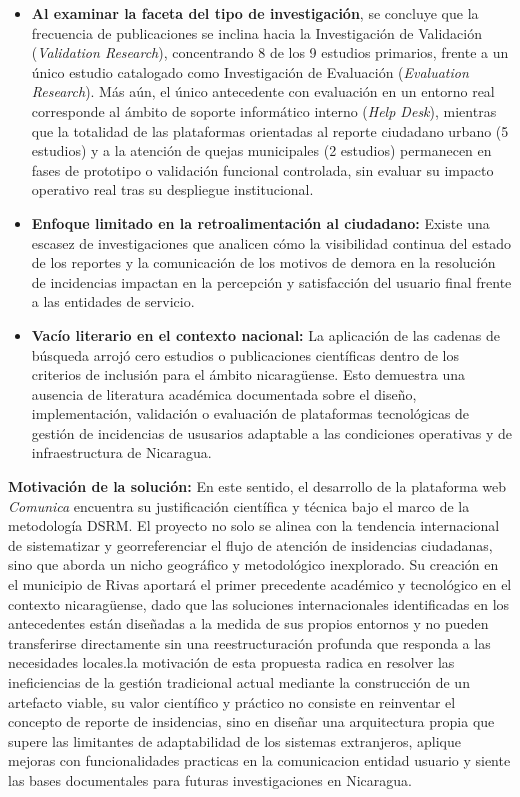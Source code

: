 \begin{itemize}
	\item \textbf {Al examinar la faceta del tipo de investigación}, se concluye que la frecuencia de publicaciones se inclina hacia la Investigación de Validación (\textit{Validation Research}), concentrando 8 de los 9 estudios primarios, frente a un único estudio catalogado como Investigación de Evaluación (\textit{Evaluation Research}). Más aún, el único antecedente con evaluación en un entorno real corresponde al ámbito de soporte informático interno (\textit{Help Desk}), mientras que la totalidad de las plataformas orientadas al reporte ciudadano urbano (5 estudios) y a la atención de quejas municipales (2 estudios) permanecen en fases de prototipo o validación funcional controlada, sin evaluar su impacto operativo real tras su despliegue institucional.
	
	\item \textbf{Enfoque limitado en la retroalimentación al ciudadano:} Existe una escasez de investigaciones que analicen cómo la visibilidad continua del estado de los reportes y la comunicación de los motivos de demora en la resolución de incidencias impactan en la percepción y satisfacción del usuario final frente a las entidades de servicio.
	
	\item \textbf{Vacío literario en el contexto nacional:} La aplicación de las cadenas de búsqueda arrojó cero estudios o publicaciones científicas dentro de los criterios de inclusión para el ámbito nicaragüense. Esto demuestra una ausencia de literatura académica documentada sobre el diseño, implementación, validación o evaluación de plataformas tecnológicas de gestión de incidencias de ususarios adaptable a las condiciones operativas y de infraestructura de Nicaragua.
\end{itemize}

\textbf{Motivación de la solución:} En este sentido, el desarrollo de la plataforma web \textit{Comunica} encuentra su justificación científica y técnica bajo el marco de la metodología DSRM. El proyecto no solo se alinea con la tendencia internacional de sistematizar y georreferenciar el flujo de atención de insidencias ciudadanas, sino que aborda un nicho geográfico y metodológico inexplorado. Su creación en el municipio de Rivas aportará el primer precedente académico y tecnológico en el contexto nicaragüense, dado que las soluciones internacionales identificadas en los antecedentes están diseñadas a la medida de sus propios entornos y no pueden transferirse directamente sin una reestructuración profunda que responda a las necesidades locales.la motivación de esta propuesta radica en resolver las ineficiencias de la gestión tradicional actual mediante la construcción de un artefacto viable, su valor científico y práctico no consiste en reinventar el concepto de reporte de insidencias, sino en diseñar una arquitectura propia que supere las limitantes de adaptabilidad de los sistemas extranjeros, aplique mejoras con funcionalidades practicas en la comunicacion entidad usuario y siente las bases documentales para futuras investigaciones en Nicaragua.


